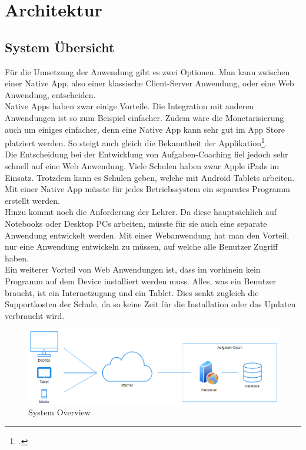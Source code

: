 \section{Architektur}
\subsection{System Übersicht}
Für die Umsetzung der Anwendung gibt es zwei Optionen. Man kann zwischen einer Native App, also einer klassische Client-Server Anwendung, oder eine Web Anwendung, entscheiden. \\

Native Apps haben zwar einige Vorteile. Die Integration mit anderen Anwendungen ist so zum Beispiel einfacher. Zudem wäre die Monetarisierung auch um einiges einfacher, denn eine Native App kann sehr gut im App Store platziert werden. So steigt auch gleich die Bekanntheit der Applikation\footcite{native_app}. \\

Die Entscheidung bei der Entwicklung von Aufgaben-Coaching fiel jedoch sehr schnell auf eine Web Anwendung. Viele Schulen haben zwar Apple iPads im Einsatz. Trotzdem kann es Schulen geben, welche mit Android Tablets arbeiten. Mit einer Native App müsste für jedes Betriebssystem ein separates Programm erstellt werden.\\

Hinzu kommt noch die Anforderung der Lehrer. Da diese hauptsächlich auf Notebooks oder Desktop PCs arbeiten, müsste für sie auch eine separate Anwendung entwickelt werden. Mit einer Webanwendung hat man den Vorteil, nur eine Anwendung entwickeln zu müssen, auf welche alle Benutzer Zugriff haben.\\

Ein weiterer Vorteil von Web Anwendungen ist, dass im vorhinein kein Programm auf dem Device installiert werden muss. Alles, was ein Benutzer braucht, ist ein Internetzugang und ein Tablet. Dies senkt zugleich die Supportkosten der Schule, da so keine Zeit für die Installation oder das Updaten verbraucht wird.

\begin{figure}[H]
\begin{center}
	\includegraphics[width=\textwidth, keepaspectratio]{images/system_overview.png}
	\caption{System Overview}
	\label{fig:system_overview}
\end{center}
\end{figure}


